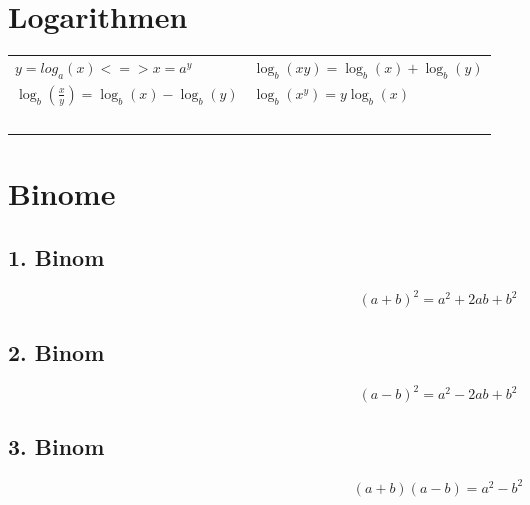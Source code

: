 \documentclass[../main.tex]{subfiles}
\begin{document}
\section{Logarithmen}

\begin{tabularx}{1\textwidth} { 
    >{\centering\arraybackslash}X 
    >{\centering\arraybackslash}X  }
    \begin{math}
        y = log_a(x) <=> x = a^y
    \end{math}
    &
    \begin{math}
        \log_{b}(xy) = \log_{b}(x) + \log_{b}(y)
    \end{math}
    \\ [7pt]
    \begin{math}
        \log_{b}(\frac{x}{y}) = \log_{b}(x) - \log_{b}(y)
    \end{math}
    &
    \begin{math}
        \log_{b}(x^y) = y \log_{b}(x)
    \end{math}
    \\ [7pt]
    \begin{math}
        {}
    \end{math}
    &
    \begin{math}
        {}
    \end{math}
    \\ [7pt]
\end{tabularx}

\section{Binome}
\subsection{1. Binom}
\[(a+b)^2 = a^2 + 2ab + b^2\]

\subsection{2. Binom}
\[(a-b)^2 = a^2 - 2ab + b^2\]

\subsection{3. Binom}
\[(a+b)(a-b) = a^2 -b^2\]

\end{document}
